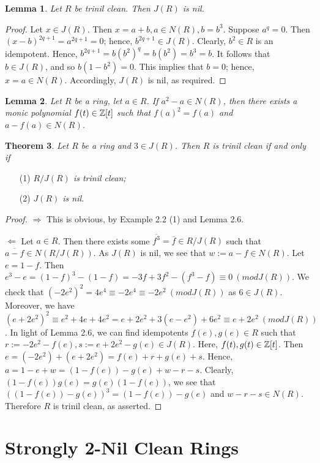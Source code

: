 \documentclass[12pt, reqno]{amsart}
\newtheorem{thm}{Theorem}[section]
\newtheorem{lem}[thm]{Lemma}
\numberwithin{equation}{section}
\begin{document}
\begin{lem} Let $R$ be trinil clean. Then $J(R)$ is nil.\end{lem}
\begin{proof} Let $x\in J(R)$. Then $x=a+b, a\in N(R), b=b^3$. Suppose $a^q=0$. Then
$(x-b)^{2q+1}=a^{2q+1}=0$; hence, $b^{2q+1}\in J(R)$. Clearly, $b^2\in R$ is an idempotent. Hence, $b^{2q+1}=b(b^2)^q=b(b^2)=b^3=b$. It follows that $b\in J(R)$, and so $b(1-b^2)=0$. This implies that $b=0$; hence, $x=a\in N(R)$. Accordingly, $J(R)$ is nil, as required.\end{proof}

\begin{lem} \cite[Lemma 3.5]{KW} Let $R$ be a ring, let $a\in R$. If $a^2-a\in N(R)$, then there exists a monic polynomial $f(t)\in {\Bbb Z}[t]$ such that
$f(a)^2=f(a)$ and $a-f(a)\in N(R)$.\end{lem}

\begin{thm} Let $R$ be a ring and $3\in J(R)$. Then $R$ is trinil clean if and only if
\end{thm}
\begin{enumerate}
\item [(1)]{\it $R/J(R)$ is trinil clean;}
\vspace{-.5mm}
\item [(2)]{\it $J(R)$ is nil.}
\end{enumerate}
\begin{proof} $\Longrightarrow $ This is obvious, by Example 2.2 (1) and Lemma 2.6.

$\Longleftarrow $ Let $a\in R$. Then there exists some $\overline{f^3}=\overline{f}\in R/J(R)$ such that $\overline{a-f}\in N(R/J(R))$.
As $J(R)$ is nil, we see that $w:=a-f\in N(R)$.
Let $e=1-f$. Then $e^3-e=(1-f)^3-(1-f)=-3f+3f^2-(f^3-f)\equiv 0~(mod J(R))$.
We check that $(-2e^2)^2=4e^4\equiv -2e^4\equiv -2e^2 ~(mod J(R))$ as $6\in J(R)$.
Moreover, we have $(e+2e^2)^2\equiv e^2+4e+4e^2=e+2e^2+3(e-e^2)+6e^2\equiv e+2e^2~(mod J(R))$.
In light of Lemma 2.6, we can find idempotents $f(e),g(e)\in R$ such that
$r:=-2e^2-f(e), s:=e+2e^2-g(e)\in J(R)$. Here, $f(t),g(t)\in {\Bbb Z}[t]$. Then
$e=(-2e^2)+(e+2e^2)=f(e)+r+g(e)+s$. Hence,
$a=1-e+w=(1-f(e))-g(e)+w-r-s$.
Clearly, $(1-f(e))g(e)=g(e)(1-f(e))$, we see that
$((1-f(e))-g(e))^3=(1-f(e))-g(e)$ and $w-r-s\in N(R)$.
Therefore $R$ is trinil clean, as asserted.\end{proof}

\section{Strongly 2-Nil Clean Rings}
\end{document}
